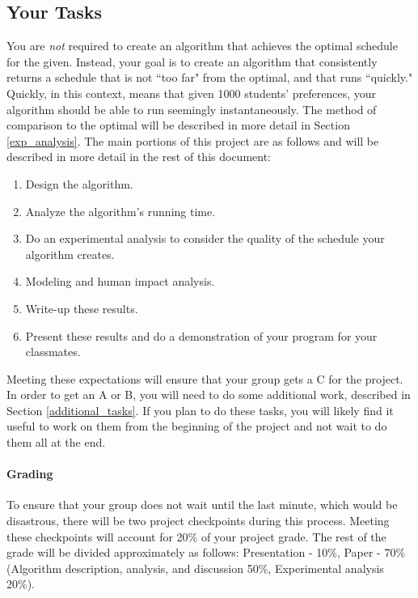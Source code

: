 \documentclass[12pt]{article}
\begin{document}
\subsection{Your Tasks}
You are \emph{not} required to create an algorithm that achieves the optimal schedule for the given. Instead, your goal is to create an algorithm that consistently returns a schedule that is not ``too far" from the optimal, and that runs ``quickly." Quickly, in this context, means that given 1000 students' preferences, your algorithm should be able to run seemingly instantaneously. The method of comparison to the optimal will be described in more detail in Section \ref{exp_analysis}.
The main portions of this project are as follows and will be described in more detail in the rest of this document:
\begin{enumerate}
\item Design the algorithm.
\item Analyze the algorithm's running time.
\item Do an experimental analysis to consider the quality of the schedule your algorithm creates.
\item Modeling and human impact analysis.
\item Write-up these results.
\item Present these results and do a demonstration of your program for your classmates.
\end{enumerate}

Meeting these expectations will ensure that your group gets a C for the project.  In order to get an A or B, you will need to do some additional work, described in Section \ref{additional_tasks}.  If you plan to do these tasks, you will likely find it useful to work on them from the beginning of the project and not wait to do them all at the end.

\paragraph{Grading}
To ensure that your group does not wait until the last minute, which would be disastrous, there will be two project checkpoints during this process. Meeting these checkpoints will account for 20\% of your project grade. The rest of the grade will be divided approximately as follows: Presentation - 10\%, Paper - 70\% (Algorithm description, analysis, and discussion 50\%, Experimental analysis 20\%).
\end{document}
